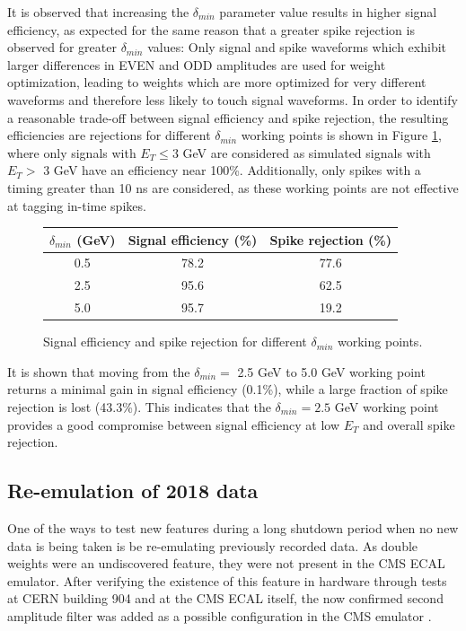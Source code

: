 It is observed that increasing the $\delta_{min}$ parameter value results in higher signal efficiency, as expected for the same reason that a greater spike rejection is observed for greater $\delta_{min}$ values: Only signal and spike waveforms which exhibit larger differences in EVEN and ODD amplitudes are used for weight optimization, leading to weights which are more optimized for very different waveforms and therefore less likely to touch signal waveforms. In order to identify a reasonable trade-off between signal efficiency and spike rejection, the resulting efficiencies are rejections for different $\delta_{min}$ working points is shown in Figure \ref{fig:SpikeRejSigEffTable}, where only signals with $E_{T} \leq 3$ GeV are considered as simulated signals with $E_{T} > $ 3 GeV have an efficiency near 100\%. Additionally, only spikes with a timing greater than 10 ns are considered, as these working points are not effective at tagging in-time spikes.

\begin{figure}
    \centering
        \begin{tabular}{|c|c|c|} \hline 
          $\delta_{min}$ (GeV) & Signal efficiency (\%) & Spike rejection (\%) \\ \hline 
         0.5 & 78.2 & 77.6 \\ \hline  
         2.5 & 95.6 & 62.5 \\ \hline 
         5.0 & 95.7 & 19.2 \\ \hline    
        \end{tabular}
    \caption{Signal efficiency and spike rejection for different $\delta_{min}$ working points.}
    \label{fig:SpikeRejSigEffTable}
\end{figure}

It is shown that moving from the $\delta_{min} = $ 2.5 GeV to 5.0 GeV working point returns a minimal gain in signal efficiency (0.1\%), while a large fraction of spike
rejection is lost (43.3\%). This indicates that the $\delta_{min} = 2.5$ GeV working point provides a good compromise between signal efficiency at low $E_{T}$ and overall spike rejection.

\subsection{Re-emulation of 2018 data} \label{sec:reEmuOf2018Data}

One of the ways to test new features during a long shutdown period when no new data is being taken is be re-emulating previously recorded data. As double weights were an undiscovered feature, they were not present in the CMS ECAL emulator. After verifying the existence of this feature in hardware through tests at CERN building 904 and at the CMS ECAL itself, the now confirmed second amplitude filter was added as a possible configuration in the CMS emulator \cite{CMSSW_DW}.

